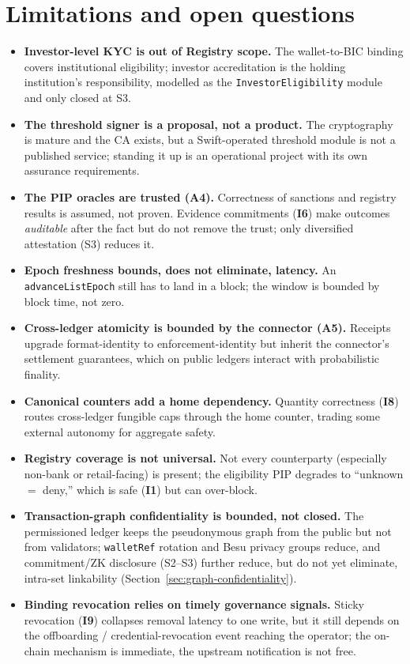\documentclass[11pt,a4paper]{article}
\newcommand{\Aref}[1]{\textbf{A#1}}
\newcommand{\Iref}[1]{\textbf{I#1}}
\begin{document}
\section{Limitations and open questions}
\label{sec:limits}

\begin{itemize}[leftmargin=1.4em,itemsep=2pt]
  \item \textbf{Investor-level KYC is out of Registry scope.} The wallet-to-BIC
  binding covers institutional eligibility; investor accreditation is the holding
  institution's responsibility, modelled as the \texttt{InvestorEligibility}
  module and only closed at S3.
  \item \textbf{The threshold signer is a proposal, not a product.} The
  cryptography is mature and the CA exists, but a Swift-operated threshold module
  is not a published service; standing it up is an operational project with its
  own assurance requirements.
  \item \textbf{The PIP oracles are trusted (\Aref{4}).} Correctness of sanctions
  and registry results is assumed, not proven. Evidence commitments (\Iref{6})
  make outcomes \emph{auditable} after the fact but do not remove the trust; only
  diversified attestation (S3) reduces it.
  \item \textbf{Epoch freshness bounds, does not eliminate, latency.} An
  \texttt{advanceListEpoch} still has to land in a block; the window is bounded by
  block time, not zero.
  \item \textbf{Cross-ledger atomicity is bounded by the connector (\Aref{5}).}
  Receipts upgrade format-identity to enforcement-identity but inherit the
  connector's settlement guarantees, which on public ledgers interact with
  probabilistic finality.
  \item \textbf{Canonical counters add a home dependency.} Quantity correctness
  (\Iref{8}) routes cross-ledger fungible caps through the home counter, trading
  some external autonomy for aggregate safety.
  \item \textbf{Registry coverage is not universal.} Not every counterparty
  (especially non-bank or retail-facing) is present; the eligibility PIP degrades
  to ``unknown $=$ deny,'' which is safe (\Iref{1}) but can over-block.
  \item \textbf{Transaction-graph confidentiality is bounded, not closed.} The
  permissioned ledger keeps the pseudonymous graph from the public but not from
  validators; \texttt{walletRef} rotation and Besu privacy groups reduce, and
  commitment/ZK disclosure (S2--S3) further reduce, but do not yet eliminate,
  intra-set linkability (Section~\ref{sec:graph-confidentiality}).
  \item \textbf{Binding revocation relies on timely governance signals.} Sticky
  revocation (\Iref{9}) collapses removal latency to one write, but it still
  depends on the offboarding / credential-revocation event reaching the operator;
  the on-chain mechanism is immediate, the upstream notification is not free.
\end{itemize}
\end{document}
